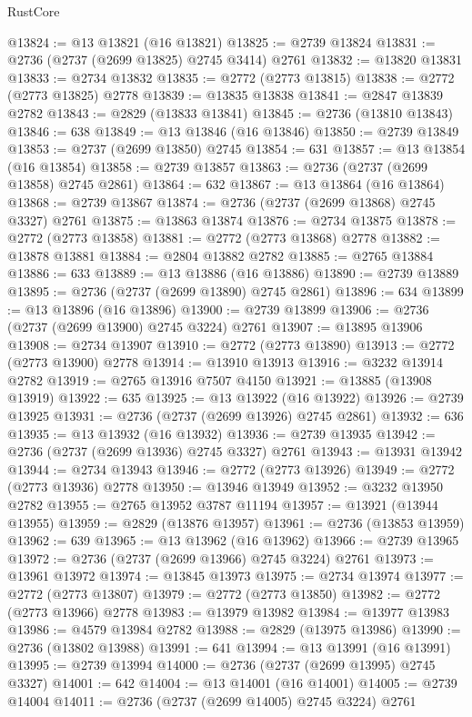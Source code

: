 \begin{lexlean}{RustCore}
\begin{coremodule}
@13824 := @13 @13821 (@16 @13821)
@13825 := @2739 @13824
@13831 := @2736 (@2737 (@2699 @13825) @2745 @3414) @2761
@13832 := @13820 @13831
@13833 := @2734 @13832
@13835 := @2772 (@2773 @13815)
@13838 := @2772 (@2773 @13825) @2778
@13839 := @13835 @13838
@13841 := @2847 @13839 @2782
@13843 := @2829 (@13833 @13841)
@13845 := @2736 (@13810 @13843)
@13846 := 638
@13849 := @13 @13846 (@16 @13846)
@13850 := @2739 @13849
@13853 := @2737 (@2699 @13850) @2745
@13854 := 631
@13857 := @13 @13854 (@16 @13854)
@13858 := @2739 @13857
@13863 := @2736 (@2737 (@2699 @13858) @2745 @2861)
@13864 := 632
@13867 := @13 @13864 (@16 @13864)
@13868 := @2739 @13867
@13874 := @2736 (@2737 (@2699 @13868) @2745 @3327) @2761
@13875 := @13863 @13874
@13876 := @2734 @13875
@13878 := @2772 (@2773 @13858)
@13881 := @2772 (@2773 @13868) @2778
@13882 := @13878 @13881
@13884 := @2804 @13882 @2782
@13885 := @2765 @13884
@13886 := 633
@13889 := @13 @13886 (@16 @13886)
@13890 := @2739 @13889
@13895 := @2736 (@2737 (@2699 @13890) @2745 @2861)
@13896 := 634
@13899 := @13 @13896 (@16 @13896)
@13900 := @2739 @13899
@13906 := @2736 (@2737 (@2699 @13900) @2745 @3224) @2761
@13907 := @13895 @13906
@13908 := @2734 @13907
@13910 := @2772 (@2773 @13890)
@13913 := @2772 (@2773 @13900) @2778
@13914 := @13910 @13913
@13916 := @3232 @13914 @2782
@13919 := @2765 @13916 @7507 @4150
@13921 := @13885 (@13908 @13919)
@13922 := 635
@13925 := @13 @13922 (@16 @13922)
@13926 := @2739 @13925
@13931 := @2736 (@2737 (@2699 @13926) @2745 @2861)
@13932 := 636
@13935 := @13 @13932 (@16 @13932)
@13936 := @2739 @13935
@13942 := @2736 (@2737 (@2699 @13936) @2745 @3327) @2761
@13943 := @13931 @13942
@13944 := @2734 @13943
@13946 := @2772 (@2773 @13926)
@13949 := @2772 (@2773 @13936) @2778
@13950 := @13946 @13949
@13952 := @3232 @13950 @2782
@13955 := @2765 @13952 @3787 @11194
@13957 := @13921 (@13944 @13955)
@13959 := @2829 (@13876 @13957)
@13961 := @2736 (@13853 @13959)
@13962 := 639
@13965 := @13 @13962 (@16 @13962)
@13966 := @2739 @13965
@13972 := @2736 (@2737 (@2699 @13966) @2745 @3224) @2761
@13973 := @13961 @13972
@13974 := @13845 @13973
@13975 := @2734 @13974
@13977 := @2772 (@2773 @13807)
@13979 := @2772 (@2773 @13850)
@13982 := @2772 (@2773 @13966) @2778
@13983 := @13979 @13982
@13984 := @13977 @13983
@13986 := @4579 @13984 @2782
@13988 := @2829 (@13975 @13986)
@13990 := @2736 (@13802 @13988)
@13991 := 641
@13994 := @13 @13991 (@16 @13991)
@13995 := @2739 @13994
@14000 := @2736 (@2737 (@2699 @13995) @2745 @3327)
@14001 := 642
@14004 := @13 @14001 (@16 @14001)
@14005 := @2739 @14004
@14011 := @2736 (@2737 (@2699 @14005) @2745 @3224) @2761

\end{coremodule}
\end{lexlean}
